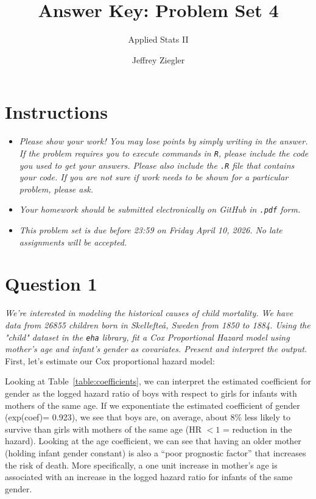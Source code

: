 \documentclass[12pt,letterpaper]{article}
\title{Answer Key: Problem Set 4}
\date{Jeffrey Ziegler}
\author{Applied Stats II}
\begin{document}
	\maketitle
	
	\section*{Instructions}
	\begin{itemize}
		\item \textit{Please show your work! You may lose points by simply writing in the answer. If the problem requires you to execute commands in \texttt{R}, please include the code you used to get your answers. Please also include the \texttt{.R} file that contains your code. If you are not sure if work needs to be shown for a particular problem, please ask.}
			\item \textit{Your homework should be submitted electronically on GitHub in \texttt{.pdf} form.}
			\item \textit{This problem set is due before 23:59 on Friday April 10, 2026. No late assignments will be accepted.}
	\end{itemize}
	\vspace{.25cm}
	
	\section*{Question 1}
	\vspace{.25cm}
	\noindent \emph{We're interested in modeling the historical causes of child mortality. We have data from 26855 children born in Skellefteå, Sweden from 1850 to 1884. Using the "child" dataset in the \texttt{eha} library, fit a Cox Proportional Hazard model using mother's age and infant's gender as covariates. Present and interpret the output.}\\
	
	First, let's estimate our Cox proportional hazard model:
	\vspace{.25cm}
	 
	\vspace{.25cm}
	\noindent Looking at Table~\ref{table:coefficients}, we can interpret the estimated coefficient for gender as the logged hazard ratio of boys with respect to girls for infants with mothers of the same age. If we exponentiate the estimated coefficient of gender (exp(coef)= 0.923), we see that boys are, on average, about 8\% less likely to survive than girls with mothers of the same age (HR $< 1$ = reduction in the hazard). Looking at the age coefficient, we can see that having an older mother (holding infant gender constant) is also a “poor prognostic factor” that increases the risk of death. More specifically, a one unit increase in mother's age is associated with an increase in the logged hazard ratio for infants of the same gender.
	
\end{document}
